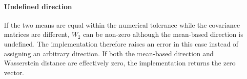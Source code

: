 \documentclass[a4paper]{article}
\begin{document}
   \paragraph{Undefined direction}
   If the two means are equal within the numerical tolerance while the covariance matrices are different, $W_2$ can be non-zero although the mean-based direction is undefined. The implementation therefore raises an error in this case instead of assigning an arbitrary direction. If both the mean-based direction and Wasserstein distance are effectively zero, the implementation returns the zero vector.

   
   
\end{document}

